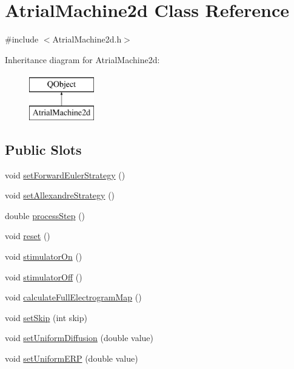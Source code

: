 \hypertarget{class_atrial_machine2d}{\section{Atrial\+Machine2d Class Reference}
\label{class_atrial_machine2d}
}


{\ttfamily \#include $<$Atrial\+Machine2d.\+h$>$}

Inheritance diagram for Atrial\+Machine2d\+:\begin{figure}[H]
\begin{center}
\leavevmode
\includegraphics[height=2.000000cm]{class_atrial_machine2d}
\end{center}
\end{figure}
\subsection*{Public Slots}
\begin{DoxyCompactItemize}
\item 
void \hyperlink{class_atrial_machine2d_ab4833c86a56f23867915d876fac581e0}{set\+Forward\+Euler\+Strategy} ()
\item 
void \hyperlink{class_atrial_machine2d_af808c57f5af0c0c26aadcf4c812cb21f}{set\+Allexandre\+Strategy} ()
\item 
double \hyperlink{class_atrial_machine2d_a2a59d6433bd614ff51bc07227210b2e8}{process\+Step} ()
\item 
void \hyperlink{class_atrial_machine2d_a3c509a3d7d9da2b758caa7347bb3ea78}{reset} ()
\item 
void \hyperlink{class_atrial_machine2d_afe82e33fbf54bfc0e75fde82668fba17}{stimulator\+On} ()
\item 
void \hyperlink{class_atrial_machine2d_a4507c491b92b5be2bb8c9493cc67e5cb}{stimulator\+Off} ()
\item 
void \hyperlink{class_atrial_machine2d_a9a600c1251eae56fe59c4188f1735a0b}{calculate\+Full\+Electrogram\+Map} ()
\item 
void \hyperlink{class_atrial_machine2d_a5e5d865f2142795acca445437cc2346d}{set\+Skip} (int skip)
\item 
void \hyperlink{class_atrial_machine2d_a2bc748b9fda32f5efe515474df2c85e6}{set\+Uniform\+Diffusion} (double value)
\item 
void \hyperlink{class_atrial_machine2d_af78de39e9b9eee079240900b932fa5f0}{set\+Uniform\+E\+R\+P} (double value)
\end{DoxyCompactItemize}
